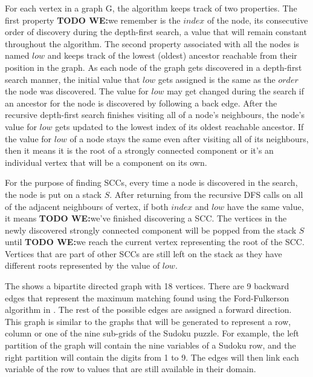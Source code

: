 \documentclass{l4proj}
\begin{document}
\noindent For each vertex in a graph G, the algorithm keeps track of two properties. The first property \textbf{TODO WE:}we remember is the $index$ of the node, its consecutive order of discovery during the depth-first search, a value that will remain constant throughout the algorithm. The second property associated with all the nodes is named $low$ and keeps track of the lowest (oldest) ancestor reachable from their position in the graph. As each node of the graph gets discovered in a depth-first search manner, the initial value that $low$ gets assigned is the same as the $order$ the node was discovered. The value for $low$ may get changed during the search if an ancestor for the node is discovered by following a back edge. After the recursive depth-first search finishes visiting all of a node’s neighbours, the node’s value for $low$ gets updated to the lowest index of its oldest reachable ancestor. If the value for $low$ of a node stays the same even after visiting all of its neighbours, then it means it is the root of a strongly connected component or it’s an individual vertex that will be a component on its own. \cite{tarjan1972depth}

\noindent For the purpose of finding SCCs, every time a node is discovered in the search, the node is put on a stack $S$. After returning from the recursive DFS calls on all of the adjacent neighbours of vertex, if both $index$ and $low$ have the same value, it means \textbf{TODO WE:}we’ve finished discovering a SCC. The vertices in the newly discovered strongly connected component will be popped from the stack $S$ until \textbf{TODO WE:}we reach the current vertex representing the root of the SCC. Vertices that are part of other SCCs are still left on the stack as they have different roots represented by the value of $low$.

\noindent The  shows a bipartite directed graph with 18 vertices. There are 9 backward edges that represent the maximum matching found using the Ford-Fulkerson algorithm in . The rest of the possible edges are assigned a forward direction. This graph is similar to the graphs that will be generated to represent a row, column or one of the nine sub-grids of the Sudoku puzzle. For example, the left partition of the graph will contain the nine variables of a Sudoku row, and the right partition will contain the digits from 1 to 9. The edges will then link each variable of the row to values that are still available in their domain.
\end{document}
